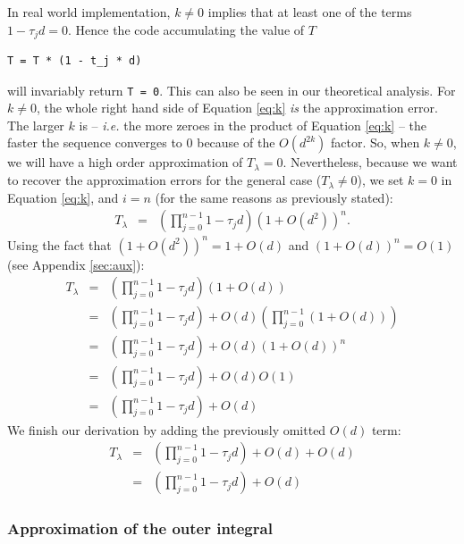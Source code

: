 In real world implementation, $k \neq 0$ implies that at least one of the terms $1 - \tau_j d = 0$. Hence the code accumulating the value of $T$
\begin{verbatim}
T = T * (1 - t_j * d)
\end{verbatim}
will invariably return \texttt{T = 0}. This can also be seen in our theoretical analysis. For $k \neq 0$, the whole right hand side of Equation \eqref{eq:k} \emph{is} the approximation error. The larger $k$ is -- \emph{i.e.} the more zeroes in the product of Equation \eqref{eq:k} --  the faster the sequence converges to $0$ because of the $O(d^{2k})$ factor. So, when $k \neq 0$, we will have a high order approximation of $T_\lambda = 0$. Nevertheless, because we want to recover the approximation errors for the general case ($T_\lambda \neq 0$), we set $k = 0$ in Equation \eqref{eq:k}, and $i = n$ (for the same reasons as previously stated):
\begin{eqnarray}
T_\lambda
& = &\left( \prod_{j = 0}^{n-1} 1 - \tau_jd \right) (1 + O(d^2) )^{n}.
\end{eqnarray}
%
Using the fact that $(1 + O(d^2) )^{n} = 1 + O(d)$ and $(1 + O(d) )^{n} = O(1)$ (see Appendix \ref{sec:aux}):
\begin{eqnarray}
T_\lambda
& = &\left( \prod_{j = 0}^{n-1} 1 - \tau_jd \right) (1 + O(d))\\
& = &\left( \prod_{j = 0}^{n-1} 1 - \tau_jd \right)  +  O(d)\left( \prod_{j = 0}^{n-1} (1 + O(d)) \right) \\
& = &\left( \prod_{j = 0}^{n-1} 1 - \tau_jd \right)  +  O(d)(1 + O(d))^n \\
& = &\left( \prod_{j = 0}^{n-1} 1 - \tau_jd \right) + O(d)O(1) \\
& = &\left( \prod_{j = 0}^{n-1} 1 - \tau_jd \right) + O(d)
\end{eqnarray}
We finish our derivation by adding the previously omitted $O(d)$ term:
\begin{eqnarray}
T_\lambda
& = &\left( \prod_{j = 0}^{n-1} 1 - \tau_jd \right) + O(d) + O(d)\\
& = &\left( \prod_{j = 0}^{n-1} 1 - \tau_jd \right) + O(d)
\end{eqnarray}

\subsubsection{Approximation of the outer integral}

